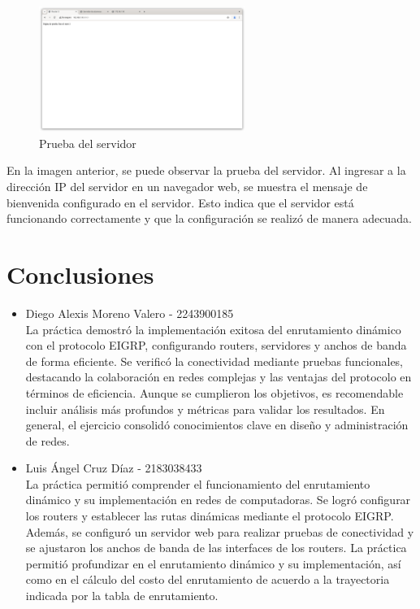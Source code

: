     \begin{figure}[H]
        \centering
        \includegraphics[width=0.6\textwidth]{img/prueba.png}
        \caption{Prueba del servidor}
        \label{fig:prueba}
    \end{figure}
    En la imagen anterior, se puede observar la prueba del servidor. Al ingresar a la dirección IP del servidor en un navegador web, se muestra el mensaje de bienvenida configurado en el servidor. Esto indica que el servidor está funcionando correctamente y que la configuración se realizó de manera adecuada.


\section{Conclusiones}
    \begin{itemize}
        \item Diego Alexis Moreno Valero - 2243900185 \\
        La práctica demostró la implementación exitosa del enrutamiento dinámico con el protocolo EIGRP, configurando routers, servidores y anchos de banda de forma eficiente. Se verificó la conectividad mediante pruebas funcionales, destacando la colaboración en redes complejas y las ventajas del protocolo en términos de eficiencia. Aunque se cumplieron los objetivos, es recomendable incluir análisis más profundos y métricas para validar los resultados. En general, el ejercicio consolidó conocimientos clave en diseño y administración de redes.
        \item Luis Ángel Cruz Díaz - 2183038433 \\
        La práctica permitió comprender el funcionamiento del enrutamiento dinámico y su implementación en redes de computadoras. Se logró configurar los routers y establecer las rutas dinámicas mediante el protocolo EIGRP. Además, se configuró un servidor web para realizar pruebas de conectividad y se ajustaron los anchos de banda de las interfaces de los routers. La práctica permitió profundizar en el enrutamiento dinámico y su implementación, así como en el cálculo del costo del enrutamiento de acuerdo a la trayectoria indicada por la tabla de enrutamiento.
    \end{itemize}


